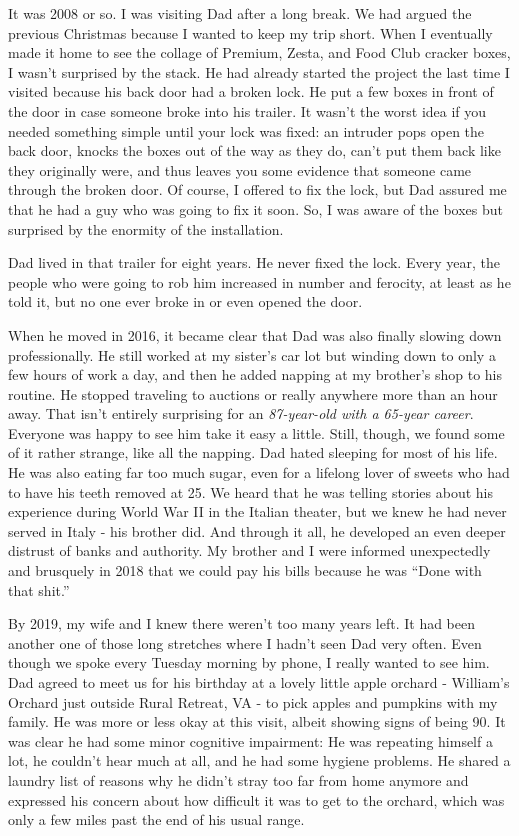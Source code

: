 \documentclass{article}
\begin{document}
It was 2008 or so. I was visiting Dad after a long break. We had argued the previous Christmas because I wanted to keep my trip short. When I eventually made it home to see the collage of Premium, Zesta, and Food Club cracker boxes, I wasn't surprised by the stack. He had already started the project the last time I visited because his back door had a broken lock. He put a few boxes in front of the door in case someone broke into his trailer. It wasn't the worst idea if you needed something simple until your lock was fixed: an intruder pops open the back door, knocks the boxes out of the way as they do, can't put them back like they originally were, and thus leaves you some evidence that someone came through the broken door. Of course, I offered to fix the lock, but Dad assured me that he had a guy who was going to fix it soon. So, I was aware of the boxes but surprised by the enormity of the installation.

Dad lived in that trailer for eight years. He never fixed the lock. Every year, the people who were going to rob him increased in number and ferocity, at least as he told it, but no one ever broke in or even opened the door.

When he moved in 2016, it became clear that Dad was also finally slowing down professionally. He still worked at my sister's car lot but winding down to only a few hours of work a day, and then he added napping at my brother's shop to his routine. He stopped traveling to auctions or really anywhere more than an hour away. That isn't entirely surprising for an \textit{87-year-old with a 65-year career}. Everyone was happy to see him take it easy a little. Still, though, we found some of it rather strange, like all the napping. Dad hated sleeping for most of his life. He was also eating far too much sugar, even for a lifelong lover of sweets who had to have his teeth removed at 25. We heard that he was telling stories about his experience during World War II in the Italian theater, but we knew he had never served in Italy - his brother did. And through it all, he developed an even deeper distrust of banks and authority. My brother and I were informed unexpectedly and brusquely in 2018 that we could pay his bills because he was ``Done with that shit.''

By 2019, my wife and I knew there weren't too many years left. It had been another one of those long stretches where I hadn't seen Dad very often. Even though we spoke every Tuesday morning by phone, I really wanted to see him. Dad agreed to meet us for his birthday at a lovely little apple orchard - William's Orchard just outside Rural Retreat, VA - to pick apples and pumpkins with my family. He was more or less okay at this visit, albeit showing signs of being 90. It was clear he had some minor cognitive impairment: He was repeating himself a lot, he couldn't hear much at all, and he had some hygiene problems. He shared a laundry list of reasons why he didn't stray too far from home anymore and expressed his concern about how difficult it was to get to the orchard, which was only a few miles past the end of his usual range.
\end{document}
